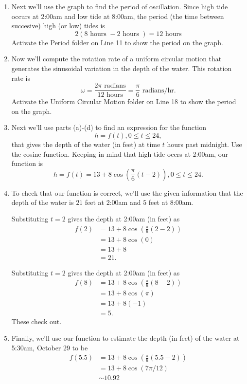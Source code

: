 \documentclass{ximera}
\begin{document}
\begin{example}
\begin{explanation}
\begin{enumerate}
\item Next we'll use the graph to find the period of oscillation. Since high tide occurs at 2:00am and low tide at 8:00am, the period (the time between succesive) high (or low) tides is
\[
    2(8 \text{ hours } - 2 \text{ hours }) = 12 \text{ hours}
\]
Activate the Period folder on Line 11 to show the period on the graph.

\item Now we'll compute the rotation rate of a uniform circular motion that generates the sinusoidal variation in the depth of the water. This rotation rate is
\[
  \omega = \frac{2\pi \text{ radians}}{12 \text{ hours}} = \frac{\pi}{6} \text{ radians/hr} .
\]
Activate the Uniform Circular Motion folder on Line 18 to show the period on the graph.

\item Next we'll use parts (a)-(d) to find an expression for the function 
\[
   h = f(t) ,  0\leq t \leq 24, 
\]
that gives the depth of the water (in feet) at time $t$ hours past midnight. Use the cosine function. Keeping in mind that high tide occrs at 2:00am, our function is 
\[
   h  = f(t) = 13 + 8 \cos \left(  \frac{\pi}{6} \left( t - 2 \right) \right),  0\leq t \leq 24.
\]



\item To check that our function is correct, we'll use the given information that the depth of the water is $21$ feet at 2:00am and $5$ feet at 8:00am.

Substituting $t=2$ gives the depth at 2:00am (in feet) as
\begin{align*}
   f(2)   & = 13 + 8 \cos \left(  \frac{\pi}{6} \left( 2 - 2 \right) \right) \\ 
           & = 13 + 8 \cos (0)  \\ 
           & = 13 + 8 \\
           & = 21 .
\end{align*}

Substituting $t=2$ gives the depth at 2:00am (in feet) as
\begin{align*}
   f(8)   & = 13 + 8 \cos \left(  \frac{\pi}{6} \left(8 - 2 \right) \right) \\ 
           & = 13 + 8 \cos (\pi)  \\ 
           & = 13 + 8(-1) \\
           & = 5 .
\end{align*}
These check out.

\item Finally, we'll use our function to estimate the depth (in feet) of the water at 5:30am, October 29 to be
\begin{align*}
   f(5.5)   & = 13 + 8 \cos \left(  \frac{\pi}{6} \left(5.5 - 2 \right) \right) \\ 
           & = 13 + 8 \cos (7\pi / 12)  \\ 
           &  \sim  10.92 \\
         \end{align*}


\end{enumerate}
\end{explanation}
\end{example}
\end{document}
